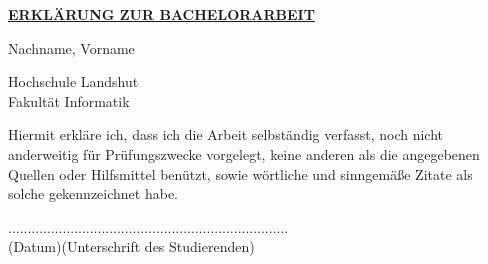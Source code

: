 \thispagestyle{empty}
\vspace{15mm}
\begin{center}
\textbf{\underline{ERKLÄRUNG ZUR BACHELORARBEIT}}
\end{center}
\vspace{25mm}
\begin{center}
\large
\large
Nachname, Vorname
\end{center}
\vspace{25mm}

\begin{center}
\huge
Hochschule Landshut \\
Fakultät Informatik 
\end{center}
\vspace{10mm}

\begin{center}
\large
Hiermit erkläre ich, dass ich die Arbeit selbständig 
verfasst, noch nicht anderweitig für Prüfungszwecke 
vorgelegt, keine anderen als die angegebenen Quellen 
oder Hilfsmittel benützt, sowie wörtliche und sinngemäße 
Zitate als solche gekennzeichnet habe.  \\
\end{center}
\vspace{55mm}

\begin{center}
....................\hspace{40mm}....................................................\\

(Datum)\hspace{47mm}(Unterschrift des Studierenden)
\end{center}

